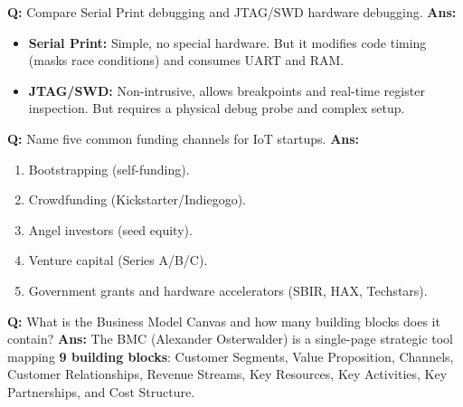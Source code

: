 \documentclass[10pt,a4paper,twocolumn]{article}
\begin{document}
\begin{tcolorbox}[
  colback=white,
  colframe=UnitColorEight,
  colbacktitle=gray!10!white,
  coltitle=black,
  fonttitle=\bfseries\sffamily\small,
  title={Unit VIII $\bullet$ Card 5},
  boxrule=1.2pt,
  arc=2mm,
  outer arc=2mm,
  boxsep=1.5mm,
  top=1mm,
  bottom=1mm,
  left=1.5mm,
  right=1.5mm,
  before skip=2.5mm,
  after skip=2.5mm
]
\textbf{Q:} Compare Serial Print debugging and JTAG/SWD hardware debugging.
\tcbline
\textbf{Ans:} \begin{itemize}
  \item \textbf{Serial Print:} Simple, no special hardware. But it modifies code timing (masks race conditions) and consumes UART and RAM.
  \item \textbf{JTAG/SWD:} Non-intrusive, allows breakpoints and real-time register inspection. But requires a physical debug probe and complex setup.
\end{itemize}
\end{tcolorbox}


\begin{tcolorbox}[
  colback=white,
  colframe=UnitColorEight,
  colbacktitle=gray!10!white,
  coltitle=black,
  fonttitle=\bfseries\sffamily\small,
  title={Unit VIII $\bullet$ Card 6},
  boxrule=1.2pt,
  arc=2mm,
  outer arc=2mm,
  boxsep=1.5mm,
  top=1mm,
  bottom=1mm,
  left=1.5mm,
  right=1.5mm,
  before skip=2.5mm,
  after skip=2.5mm
]
\textbf{Q:} Name five common funding channels for IoT startups.
\tcbline
\textbf{Ans:} \begin{enumerate}
  \item Bootstrapping (self-funding).
  \item Crowdfunding (Kickstarter/Indiegogo).
  \item Angel investors (seed equity).
  \item Venture capital (Series A/B/C).
  \item Government grants and hardware accelerators (SBIR, HAX, Techstars).
\end{enumerate}
\end{tcolorbox}


\begin{tcolorbox}[
  colback=white,
  colframe=UnitColorEight,
  colbacktitle=gray!10!white,
  coltitle=black,
  fonttitle=\bfseries\sffamily\small,
  title={Unit VIII $\bullet$ Card 7},
  boxrule=1.2pt,
  arc=2mm,
  outer arc=2mm,
  boxsep=1.5mm,
  top=1mm,
  bottom=1mm,
  left=1.5mm,
  right=1.5mm,
  before skip=2.5mm,
  after skip=2.5mm
]
\textbf{Q:} What is the Business Model Canvas and how many building blocks does it contain?
\tcbline
\textbf{Ans:} The BMC (Alexander Osterwalder) is a single-page strategic tool mapping \textbf{9 building blocks}: Customer Segments, Value Proposition, Channels, Customer Relationships, Revenue Streams, Key Resources, Key Activities, Key Partnerships, and Cost Structure.
\end{tcolorbox}
\end{document}
